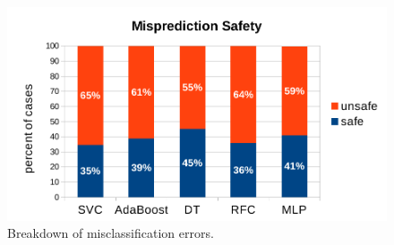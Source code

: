 \begin{figure}[ht]
\includegraphics[width=1.0\textwidth]{images/prediction_stats.pdf}
\caption{Breakdown of misclassification errors.}
\label{fig:prediction_stats}
\vspace{-5mm}
\end{figure}
